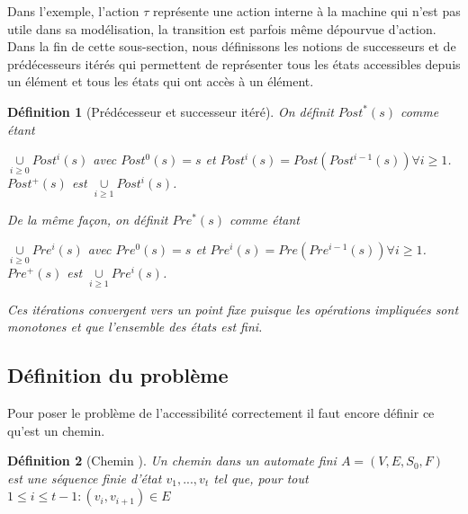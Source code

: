 \documentclass[a4paper]{report}
\theoremstyle{break}
\newtheorem{defin}{Définition}
\begin{document}
Dans l'exemple, l'action $\tau$ représente une action interne à la machine qui n'est pas utile dans sa modélisation, la transition est parfois même dépourvue d'action.\\

Dans la fin de cette sous-section, nous définissons les notions de successeurs et de prédécesseurs itérés qui permettent de représenter tous les états accessibles depuis un élément et tous les états qui ont accès à un élément.


\begin{defin}[Prédécesseur et successeur itéré\cite{baier2008principles}]
On définit $Post^*(s)$ comme étant 
\begin{center}$\underset{i \geq 0}{\cup} Post^i(s)$ avec $Post^0(s) = s$ et $Post^i(s) = Post(Post^{i-1}(s)) \forall i \geq 1$.\\
$Post^+(s)$ est $\underset{i \geq 1}{\cup} Post^i(s)$.
\end{center}
De la même façon, on définit $Pre^*(s)$ comme étant
\begin{center}
$\underset{i \geq 0}{\cup} Pre^i(s)$ avec $Pre^0(s) = s$ et $Pre^i(s) = Pre(Pre^{i-1}(s)) \forall i \geq 1$.\\
$Pre^+(s)$ est $\underset{i \geq 1}{\cup} Pre^i(s)$.
\end{center}

Ces itérations convergent vers un point fixe puisque les opérations impliquées sont monotones et que l'ensemble des états est fini.
\end{defin}

\subsection{Définition du problème}
Pour poser le problème de l'accessibilité correctement il faut encore définir ce qu'est un chemin.

\begin{defin}[Chemin \cite{geeraerts2013multiprocessor}]
Un chemin dans un automate fini $A = (V, E, S_0, F)$ est une séquence finie d'état $v_1, ..., v_t$ tel que, pour tout $1 \leq i \leq t-1 : (v_i, v_{i+1}) \in E$ 
\end{defin}
\end{document}
